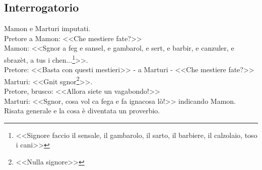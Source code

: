 \subsection{Interrogatorio}
Mamon e Marturi imputati.\\
\indent Pretore a Mamon: <<Che mestiere fate?>>\\
\indent {}Mamon: <<Sgnor a feg e sansel, e gambarol, e sert, e barbir, e canzuler, e sbrazèt, a tus i chen...\footnote{<<Signore faccio il sensale, il gambarolo, il sarto, il barbiere, il calzolaio, toso i cani>>}>>.\\
\indent Pretore: <<Basta con questi mestieri>> - a Marturi - <<Che mestiere fate?>>\\
\indent {}Marturi: <<Gnit sgnor\footnote{<<Nulla signore>>}>>.\\
\indent Pretore, brusco: <<Allora siete un vagabondo!>>\\
\indent Marturi: <<Sgnor, cosa vol ca fega e fa ignacosa lò!>> indicando Mamon.\\
\indent Risata generale e la cosa è diventata un proverbio.

